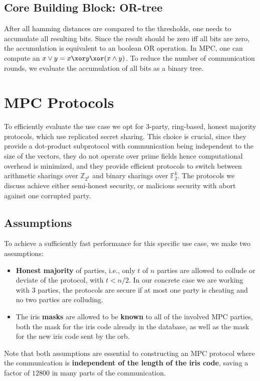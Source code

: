 \documentclass[a4paper,11pt,
]{article}
\newcommand{\F}{\ensuremath{\mathbb{F}}\xspace}
\newcommand{\Z}{\ensuremath{\mathbb{Z}}\xspace}
\begin{document}
\subsection{Core Building Block: OR-tree}

After all hamming distances are compared to the thresholds, one needs to accumulate all resulting bits. Since the result should be zero iff all bits are zero, the accumulation is equivalent to an boolean OR operation. In MPC, one can compute an $x \vee y = x \xor y \xor (x \wedge y)$. To reduce the number of communication rounds, we evaluate the accumulation of all bits as a binary tree.


\section{MPC Protocols}\label{sec::prelim:mpc}

To efficiently evaluate the use case we opt for 3-party, ring-based, honest majority protocols, which use replicated secret sharing. This choice is crucial, since they provide a dot-product subprotocol with communication being independent to the size of the vectors, they do not operate over prime fields hence computational overhead is minimized, and they provide efficient protocols to switch between arithmetic sharings over $\Z_{2^k}$ and binary sharings over $\F_2^k$. The protocols we discuss achieve either semi-honest security, or malicious security with abort against one corrupted party.

\subsection{Assumptions}

To achieve a sufficiently fast performance for this specific use case, we make two assumptions:
\begin{itemize}
    \item \textbf{Honest majority} of parties, i.e., only $t$ of $n$ parties are allowed to collude or deviate of the protocol, with $t < n/2$. In our concrete case we are working with 3 parties, the protocols are secure if at most one party is cheating and no two parties are colluding.
    \item The iris \textbf{masks} are allowed to be \textbf{known} to all of the involved MPC parties, both the mask for the iris code already in the database, as well as the mask for the new iris code sent by the orb.
\end{itemize}
Note that both assumptions are essential to constructing an MPC protocol where the communication is \textbf{independent of the length of the iris code}, saving a factor of $12800$ in many parts of the communication.
\end{document}
